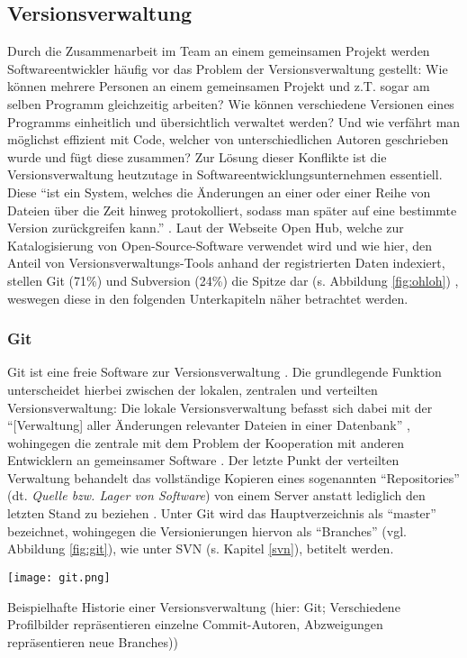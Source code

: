 \subsection{Versionsverwaltung}
Durch die Zusammenarbeit im Team an einem gemeinsamen Projekt werden Softwareentwickler häufig vor das Problem der Versionsverwaltung gestellt: Wie können mehrere Personen an einem gemeinsamen Projekt und z.T. sogar am selben Programm gleichzeitig arbeiten?
Wie können verschiedene Versionen eines Programms einheitlich und übersichtlich verwaltet werden? Und wie verfährt man möglichst effizient mit Code, welcher von unterschiedlichen Autoren geschrieben wurde und fügt diese zusammen? Zur Lösung dieser Konflikte 
ist die Versionsverwaltung heutzutage in Softwareentwicklungsunternehmen essentiell. Diese \enquote{ist ein System, welches die Änderungen an einer oder einer Reihe von Dateien über die Zeit hinweg protokolliert, sodass man später auf eine bestimmte Version 
zurückgreifen kann.} \cite{Scott-Chacon:2020aa}. Laut der Webseite Open Hub, welche zur Katalogisierung von Open-Source-Software verwendet wird und wie hier, den Anteil von Versionsverwaltungs-Tools anhand der registrierten Daten indexiert, stellen Git (71\%) 
und Subversion (24\%) die Spitze dar (s. Abbildung \ref{fig:ohloh}) \cite{Inc.:2020aa}, weswegen diese in den folgenden Unterkapiteln näher betrachtet werden.

\subsubsection{Git} \label{git}
Git ist eine freie Software zur Versionsverwaltung \cite{Git:2020aa}. Die grundlegende Funktion unterscheidet hierbei zwischen der lokalen, zentralen und verteilten Versionsverwaltung: Die lokale Versionsverwaltung befasst sich dabei mit der \enquote{[Verwaltung] aller Änderungen relevanter Dateien in einer Datenbank} \cite{Scott-Chacon:2020aa}, wohingegen die
zentrale mit dem Problem der Kooperation mit anderen Entwicklern an gemeinsamer Software \cite{Scott-Chacon:2020aa}. Der letzte Punkt der verteilten Verwaltung behandelt das vollständige Kopieren eines sogenannten \enquote{Repositories} (dt. \textit{Quelle bzw. Lager von Software})
von einem Server anstatt lediglich den letzten Stand zu beziehen \cite{Scott-Chacon:2020aa}. Unter Git wird das Hauptverzeichnis als \enquote{master} bezeichnet, wohingegen die Versionierungen hiervon als \enquote{Branches} (vgl. Abbildung \ref{fig:git}), wie unter SVN (s. Kapitel \ref{svn}), betitelt werden.
\begin{marginfigure}
    \texttt{[image: git.png]}
    \caption{\label{fig:git}Beispielhafte Historie einer Versionsverwaltung (hier: Git; Verschiedene Profilbilder repräsentieren einzelne Commit-Autoren, Abzweigungen repräsentieren neue Branches))}
\end{marginfigure}


